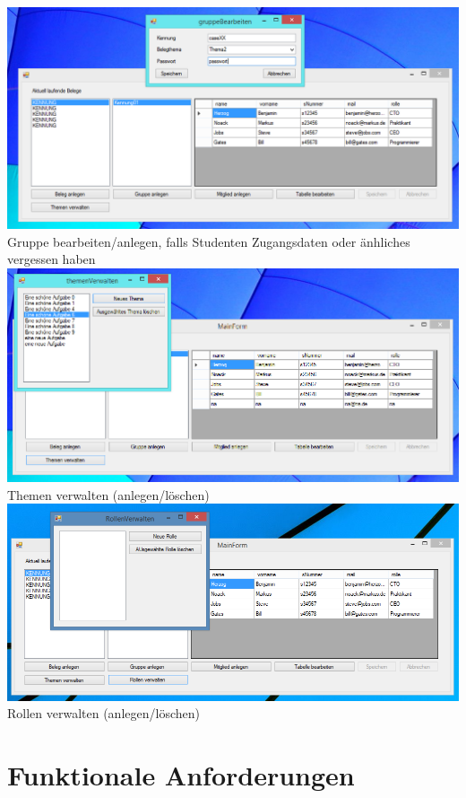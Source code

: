 \documentclass{article}
\begin{document}
\begin{center}
    \includegraphics[scale=0.6]{bilder/doz4.PNG}\\
    Gruppe bearbeiten/anlegen, falls Studenten Zugangsdaten oder änhliches vergessen haben \\
    
    \includegraphics[scale=0.6]{bilder/doz5.PNG}\\
    Themen verwalten (anlegen/löschen) \\
    
     \includegraphics[scale=0.55]{bilder/doz6.PNG}\\
    Rollen verwalten (anlegen/löschen) \\
\end{center}

\section{Funktionale Anforderungen}
\end{document}
